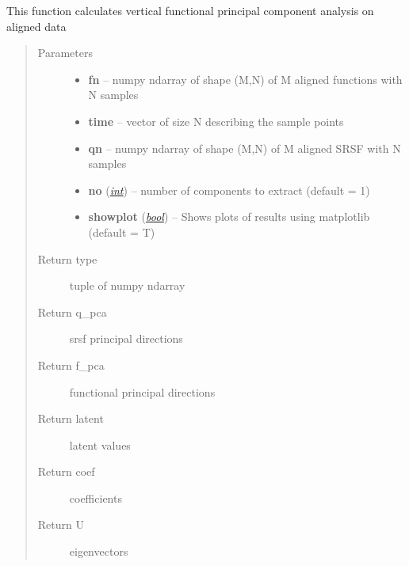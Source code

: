 \documentclass[letterpaper,10pt,english]{sphinxmanual}
\begin{document}
\begin{fulllineitems}
\label{fPCA:fPCA.vertfPCA}
This function calculates vertical functional principal component analysis on aligned data
\begin{quote}\begin{description}
\item[{Parameters}] \leavevmode\begin{itemize}
\item {} 
\textbf{fn} -- numpy ndarray of shape (M,N) of M aligned functions with N samples

\item {} 
\textbf{time} -- vector of size N describing the sample points

\item {} 
\textbf{qn} -- numpy ndarray of shape (M,N) of M aligned SRSF with N samples

\item {} 
\textbf{no} (\href{http://docs.python.org/library/functions.html\#int}{\emph{int}}) -- number of components to extract (default = 1)

\item {} 
\textbf{showplot} (\href{http://docs.python.org/library/functions.html\#bool}{\emph{bool}}) -- Shows plots of results using matplotlib (default = T)

\end{itemize}

\item[{Return type}] \leavevmode
tuple of numpy ndarray

\item[{Return q\_pca}] \leavevmode
srsf principal directions

\item[{Return f\_pca}] \leavevmode
functional principal directions

\item[{Return latent}] \leavevmode
latent values

\item[{Return coef}] \leavevmode
coefficients

\item[{Return U}] \leavevmode
eigenvectors

\end{description}\end{quote}

\end{fulllineitems}
\end{document}
